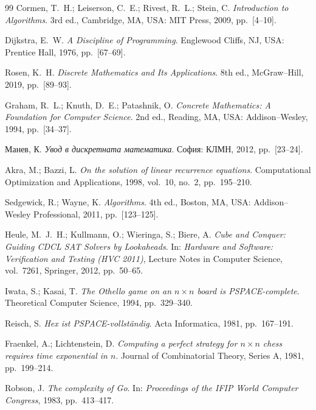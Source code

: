 \begin{thebibliography}{99}
Cormen, T.~H.; Leiserson, C.~E.; Rivest, R.~L.; Stein, C.
\newblock \emph{Introduction to Algorithms}.
\newblock 3rd ed., Cambridge, MA, USA: MIT Press, 2009, pp.~[4--10].

Dijkstra, E.~W.
\newblock \emph{A Discipline of Programming}.
\newblock Englewood Cliffs, NJ, USA: Prentice Hall, 1976, pp.~[67--69].

Rosen, K.~H.
\newblock \emph{Discrete Mathematics and Its Applications}.
\newblock 8th ed., McGraw--Hill, 2019, pp.~[89--93].

Graham, R.~L.; Knuth, D.~E.; Patashnik, O.
\newblock \emph{Concrete Mathematics: A Foundation for Computer Science}.
\newblock 2nd ed., Reading, MA, USA: Addison--Wesley, 1994, pp.~[34--37].

Манев, К.
\newblock \emph{Увод в дискретната математика}.
\newblock София: КЛМН, 2012, pp.~[23--24].

Akra, M.; Bazzi, L.
\newblock \emph{On the solution of linear recurrence equations}.
\newblock Computational Optimization and Applications, 1998, vol.~10, no.~2, pp.~195--210.

Sedgewick, R.; Wayne, K.
\newblock \emph{Algorithms}.
\newblock 4th ed., Boston, MA, USA: Addison--Wesley Professional, 2011, pp.~[123--125].


Heule, M.~J.~H.; Kullmann, O.; Wieringa, S.; Biere, A.
\newblock \emph{Cube and Conquer: Guiding CDCL SAT Solvers by Lookaheads}.
\newblock In: \emph{Hardware and Software: Verification and Testing (HVC 2011)},
Lecture Notes in Computer Science, vol.~7261, Springer, 2012, pp.~50--65.

Iwata, S.; Kasai, T.
\newblock \emph{The Othello game on an $n \times n$ board is PSPACE-complete}.
\newblock Theoretical Computer Science, 1994, pp.~329--340.

Reisch, S.
\newblock \emph{Hex ist PSPACE-vollst{\"a}ndig}.
\newblock Acta Informatica, 1981, pp.~167--191.

Fraenkel, A.; Lichtenstein, D.
\newblock \emph{Computing a perfect strategy for $n \times n$ chess requires time exponential in $n$}.
\newblock Journal of Combinatorial Theory, Series A, 1981, pp.~199--214.

Robson, J.
\newblock \emph{The complexity of Go}.
\newblock In: \emph{Proceedings of the IFIP World Computer Congress}, 1983, pp.~413--417.


\end{thebibliography}
